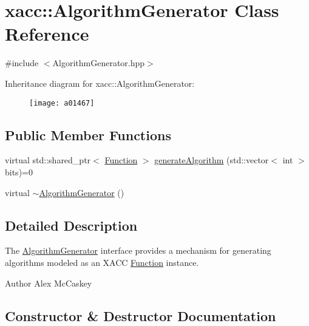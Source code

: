 \hypertarget{a01467}{}\section{xacc\+:\+:Algorithm\+Generator Class Reference}
\label{a01467}


{\ttfamily \#include $<$Algorithm\+Generator.\+hpp$>$}

Inheritance diagram for xacc\+:\+:Algorithm\+Generator\+:\begin{figure}[H]
\begin{center}
\leavevmode
\texttt{[image: a01467]}
\end{center}
\end{figure}
\subsection*{Public Member Functions}
\begin{DoxyCompactItemize}
\item 
virtual std\+::shared\+\_\+ptr$<$ \hyperlink{a01475}{Function} $>$ \hyperlink{a01467_a73023c06f0f0c62ad56ab4187b18b096}{generate\+Algorithm} (std\+::vector$<$ int $>$ bits)=0
\item 
virtual \hyperlink{a01467_a096f66aa8d65f5aa3276915768159579}{$\sim$\+Algorithm\+Generator} ()
\end{DoxyCompactItemize}


\subsection{Detailed Description}
The \hyperlink{a01467}{Algorithm\+Generator} interface provides a mechanism for generating algorithms modeled as an X\+A\+CC \hyperlink{a01475}{Function} instance.

\begin{DoxyAuthor}{Author}
Alex Mc\+Caskey 
\end{DoxyAuthor}


\subsection{Constructor \& Destructor Documentation}
\mbox{\label{a01467_a096f66aa8d65f5aa3276915768159579}} 
